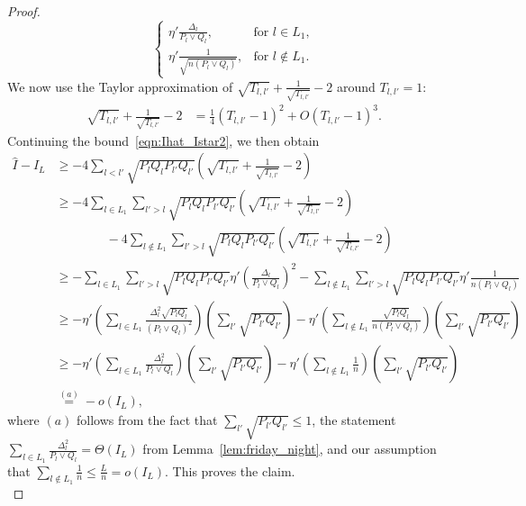 \documentclass{article}
\begin{document}
\begin{proof}
\begin{equation*}
\begin{cases}
\eta'  \frac{\Delta_l}{P_l \vee Q_l}, & \text{for } l \in L_1, \\
%
\eta' \frac{1}{\sqrt{ n (P_l \vee Q_l)}}, & \text{for } l \notin L_1.
\end{cases}
\end{equation*}
We now use the Taylor approximation of $\sqrt{T_{l,l'}} + \frac{1}{\sqrt{T_{l,l'}}} - 2$ around $T_{l,l'}=1$:
\begin{align*}
\sqrt{T_{l,l'}} + \frac{1}{\sqrt{T_{l,l'}}} -2  &= 
  \frac{1}{4} (T_{l,l'} - 1)^2 + O (T_{l,l'}-1)^3. 
\end{align*}
Continuing the bound~\eqref{eqn:Ihat_Istar2}, we then obtain
\begin{align*}
\hat{I} - I_L &\geq - 4 \sum_{l < l'} \sqrt{P_l Q_l P_{l'} Q_{l'}} 
    \left( \sqrt{T_{l,l'}} + \frac{1}{\sqrt{T_{l,l'}}} - 2 \right) \\
&\geq - 4 \sum_{l \in L_1} \sum_{l' > l} \sqrt{P_l Q_l P_{l'} Q_{l'}} 
    \left( \sqrt{T_{l,l'}} + \frac{1}{\sqrt{T_{l,l'}}} - 2 \right) \\
    & \qquad \qquad
     - 4 \sum_{l \notin L_1} \sum_{l' > l} \sqrt{P_l Q_l P_{l'} Q_{l'}} 
    \left( \sqrt{T_{l,l'}} + \frac{1}{\sqrt{T_{l,l'}}} - 2 \right) \\
  &\geq - \sum_{l \in L_1} \sum_{l' > l} \sqrt{P_l Q_l P_{l'} Q_{l'}} 
             \eta' \left( \frac{\Delta_l}{P_l \vee Q_l}  \right)^2 
        - \sum_{l \notin L_1} \sum_{l' > l} \sqrt{P_l Q_l P_{l'} Q_{l'}} 
             \eta' \frac{1}{n (P_l \vee Q_l)} \\
&\geq - \eta' \left( \sum_{l \in L_1} \frac{\Delta_l^2 \sqrt{P_l Q_l}}{(P_l \vee Q_l)^2} \right)
 	\left( \sum_{l'}  \sqrt{P_{l'}Q_{l'}} \right) 
	- \eta' \left( \sum_{l \notin L_1} \frac{\sqrt{P_lQ_l}}{n(P_l \vee Q_l)} \right) 
          \left( \sum_{l'} \sqrt{P_{l'} Q_{l'} } \right) \\
 &\geq - \eta' \left( \sum_{l \in L_1} \frac{\Delta_l^2}{P_l \vee Q_l} \right)
         \left( \sum_{l'}  \sqrt{P_{l'}Q_{l'}} \right) 
       - \eta' \left( \sum_{l \notin L_1} \frac{1}{n} \right) 
          \left( \sum_{l'} \sqrt{P_{l'} Q_{l'} } \right) \\
 &\stackrel{(a)}=  -o(I_L),
\end{align*}
where $(a)$ follows from the fact that $\sum_{l'} \sqrt{P_{l'} Q_{l'}} \leq 1$, the statement $\sum_{l \in L_1} \frac{\Delta_l^2}{P_l \vee Q_l} = \Theta(I_L)$ from Lemma~\ref{lem:friday_night}, and our assumption that  $\sum_{l \notin L_1} \frac{1}{n} \leq \frac{L}{n} = o(I_L)$. This proves the claim.\\


\end{proof}
\end{document}
